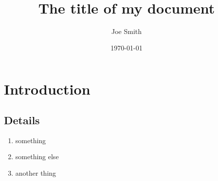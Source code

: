 \documentclass[12pt,letterpaper]{article}
\title{The title of my document}
\author{Joe Smith}
\date{\today}
\begin{document}
\maketitle

\lipsum[1]

\section{Introduction}

\lipsum[2-4]

\subsection{Details}

\lipsum[5-7]

\begin{enumerate}
\item something
\item something else
\item another thing
\end{enumerate}

\lipsum[8-12]
\end{document}
